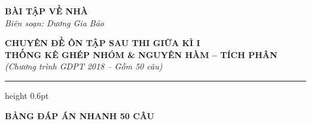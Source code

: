 \documentclass[12pt,a4paper]{article}
\begin{document}
\thispagestyle{firstpage}

\noindent
\begin{minipage}[t]{0.36\textwidth}
    \centering
    {\fontsize{12}{14}\selectfont\textbf{BÀI TẬP VỀ NHÀ}}\\[4pt]
    \textit{Biên soạn: Dương Gia Bảo}\\[6pt]
    \setlength{\fboxrule}{0.8pt}
    \setlength{\fboxsep}{5pt}
\end{minipage}\hfill
\begin{minipage}[t]{0.62\textwidth}
    \centering
    {\fontsize{13}{15}\selectfont\textbf{CHUYÊN ĐỀ ÔN TẬP SAU THI GIỮA KÌ I}}\\[3pt]
    {\fontsize{12}{14}\selectfont\textbf{THỐNG KÊ GHÉP NHÓM \& NGUYÊN HÀM -- TÍCH PHÂN}}\\[3pt]
    {\fontsize{11}{13}\selectfont\textit{(Chương trình GDPT 2018 -- Gồm 50 câu)}}
\end{minipage}

\par\vspace{4pt}
\hrule height 0.6pt
\vspace{8pt}

\begin{center}
    {\fontsize{13}{15}\selectfont\textbf{BẢNG ĐÁP ÁN NHANH 50 CÂU}}
\end{center}
\end{document}
